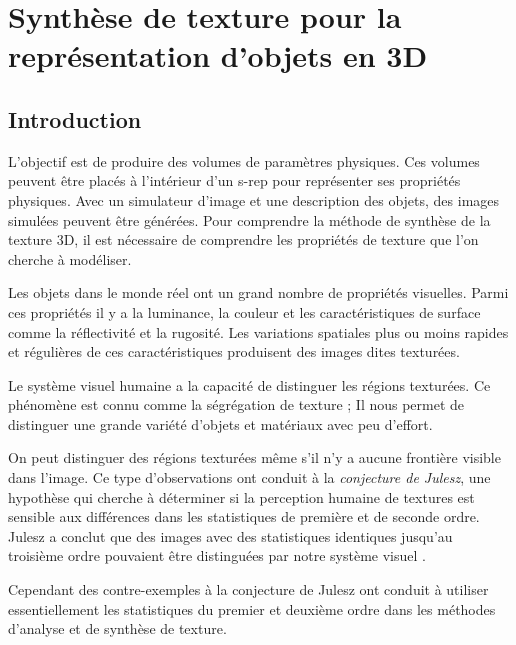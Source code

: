 \section{Synthèse de texture pour la représentation d'objets en 3D}
\label{sec:textureSynthesisfr}

\subsection{Introduction}

L'objectif est de produire des volumes de paramètres physiques.
Ces volumes peuvent être placés à l'intérieur d'un s-rep pour représenter ses propriétés physiques.
Avec un simulateur d'image et une description des objets, des images simulées peuvent être générées.
Pour comprendre la méthode de synthèse de la texture 3D, il est nécessaire de comprendre les propriétés de texture que l'on cherche 
à modéliser.

Les objets dans le monde réel ont un grand nombre de propriétés visuelles.
Parmi ces propriétés il y a la luminance, la couleur et les caractéristiques de surface 
comme la réflectivité et la rugosité.
Les variations spatiales plus ou moins rapides et régulières de ces caractéristiques 
produisent des images dites texturées.

Le système visuel humaine a la capacité de distinguer les régions texturées.
Ce phénomène est connu comme la ségrégation de texture ;
Il nous permet de distinguer une grande variété d'objets et matériaux avec peu d'effort.

On peut distinguer des régions texturées même s'il n'y a aucune frontière visible dans l'image.
Ce type d'observations ont conduit à la \textit{conjecture de Julesz}, 
une hypothèse qui cherche à déterminer si la perception 
humaine de textures est sensible aux différences dans les statistiques 
de première et de seconde ordre. 
Julesz a conclut que des images 
avec des statistiques identiques jusqu'au troisième ordre 
pouvaient être distinguées par notre système visuel \cite{julesz1978visual}.

Cependant des contre-exemples à la conjecture de Julesz ont conduit à utiliser essentiellement
les statistiques du premier et deuxième ordre dans les méthodes d'analyse et de synthèse de 
texture.

